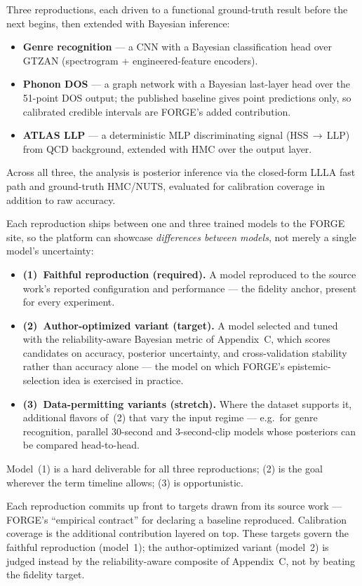 \documentclass[11pt]{article}
\begin{document}
Three reproductions, each driven to a functional ground-truth result before the next begins, then extended with Bayesian inference:
\begin{itemize}[nosep,leftmargin=1.4em]
  \item \textbf{Genre recognition} --- a CNN with a Bayesian classification head over GTZAN (spectrogram + engineered-feature encoders).
  \item \textbf{Phonon DOS} --- a graph network with a Bayesian last-layer head over the 51-point DOS output; the published baseline gives point predictions only, so calibrated credible intervals are FORGE's added contribution.
  \item \textbf{ATLAS LLP} --- a deterministic MLP discriminating signal (HSS\,$\rightarrow$\,LLP) from QCD background, extended with HMC over the output layer.
\end{itemize}
Across all three, the analysis is posterior inference via the closed-form LLLA fast path and ground-truth HMC/NUTS, evaluated for calibration coverage in addition to raw accuracy.

Each reproduction ships between one and three trained models to the FORGE site, so the platform can showcase \emph{differences between models}, not merely a single model's uncertainty:
\begin{itemize}[nosep,leftmargin=1.4em]
  \item \textbf{(1)~Faithful reproduction (required).} A model reproduced to the source work's reported configuration and performance --- the fidelity anchor, present for every experiment.
  \item \textbf{(2)~Author-optimized variant (target).} A model selected and tuned with the reliability-aware Bayesian metric of Appendix~C, which scores candidates on accuracy, posterior uncertainty, and cross-validation stability rather than accuracy alone --- the model on which FORGE's epistemic-selection idea is exercised in practice.
  \item \textbf{(3)~Data-permitting variants (stretch).} Where the dataset supports it, additional flavors of~(2) that vary the input regime --- e.g.\ for genre recognition, parallel 30-second and 3-second-clip models whose posteriors can be compared head-to-head.
\end{itemize}
Model~(1) is a hard deliverable for all three reproductions; (2) is the goal wherever the term timeline allows; (3) is opportunistic.

Each reproduction commits up front to targets drawn from its source work --- FORGE's ``empirical contract'' for declaring a baseline reproduced. Calibration coverage is the additional contribution layered on top. These targets govern the faithful reproduction (model~1); the author-optimized variant (model~2) is judged instead by the reliability-aware composite of Appendix~C, not by beating the fidelity target.
\end{document}
